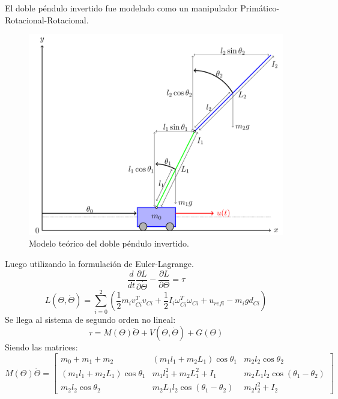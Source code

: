 %
%
%

El doble péndulo invertido fue modelado como un manipulador Primático-Rotacional-Rotacional. 
\begin{figure}[H]
	\centering
	\includegraphics[width=\linewidth]{../Modelo Teorico/ImagenesModelo Teorico/sistema}
	\caption{Modelo teórico del doble péndulo invertido.}	
	\label{fig:pendteo}
\end{figure}
Luego utilizando la formulación de Euler-Lagrange.
\begin{equation}
  \frac{d}{dt}\frac{\partial L}{\partial \dot{\Theta}} - \frac{\partial L}{\partial \Theta}  = \tau
\end{equation} 
\begin{equation}
L\left( \Theta , \dot{\Theta} \right) = \sum_{i=0}^2
\left( \frac{1}{2} m_i v_{Ci}^Tv_{Ci} +\frac{1}{2} I_i \omega_{Ci}^T\omega_{Ci} + u_{refi} - m_i g d_{Ci}\right)
\end{equation} 
Se llega al sistema de segundo orden no lineal:
\begin{equation}
\tau = M\left( \Theta \right)\ddot{\Theta} + V\left( \Theta , \dot{\Theta} \right) + G\left( \Theta \right)
\end{equation}
Siendo las matrices:
\begin{equation}
 M\left( \Theta \right)\ddot{\Theta} = \begin{bmatrix}
m_0+m_1+m_2 & \left( m_1l_1 + m_2L_1 \right) \cos \theta_1 & m_2l_2 \cos \theta_2\\

\left( m_1l_1 + m_2L_1 \right) \cos \theta_1  &
m_1l_1^2+m_2L_1^2+I_1
& m_2L_1l_2\cos(\theta_1-\theta_2)\\


m_2l_2\cos\theta_2 & m_2L_1l_2\cos(\theta_1-\theta_2) & m_2l_2^2+I_2
\end{bmatrix}
\end{equation}

